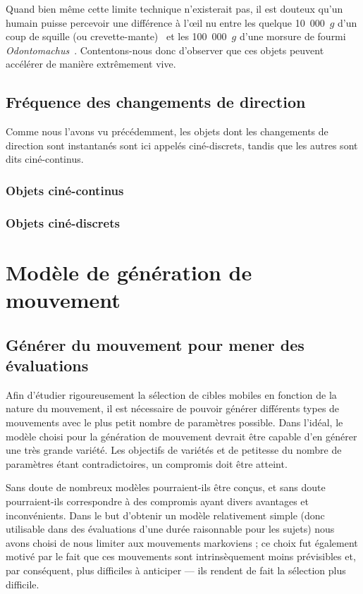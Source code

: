 	
	Quand bien même cette limite technique n'existerait pas, il est douteux qu'un humain puisse percevoir une différence à l'œil nu entre les quelque 10~000~$g$ d'un coup de squille (ou crevette-mante)~\cite{patek2004biomechanics} et les 100~000~$g$ d'une morsure de fourmi \emph{Odontomachus}~\cite{patek2006multifunctionality}. Contentons-nous donc d'observer que ces objets peuvent accélérer de manière extrêmement vive.
	
	\subsection{Fréquence des changements de direction}
	Comme nous l'avons vu précédemment, les objets dont les changements de direction sont instantanés sont ici appelés ciné-discrets, tandis que les autres sont dits ciné-continus.
	
	\subsubsection{Objets ciné-continus}
	
	\subsubsection{Objets ciné-discrets}

\section{Modèle de génération de mouvement}
    \subsection{Générer du mouvement pour mener des évaluations}
    Afin d'étudier rigoureusement la sélection de cibles mobiles en fonction de la nature du mouvement, il est nécessaire de pouvoir générer différents types de mouvements avec le plus petit nombre de paramètres possible. Dans l'idéal, le modèle choisi pour la génération de mouvement devrait être capable d'en générer une très grande variété. Les objectifs de variétés et de petitesse du nombre de paramètres étant contradictoires, un compromis doit être atteint.
    
    Sans doute de nombreux modèles pourraient-ils être conçus, et sans doute pourraient-ils correspondre à des compromis ayant divers avantages et inconvénients. Dans le but d'obtenir un modèle relativement simple (donc utilisable dans des évaluations d'une durée raisonnable pour les sujets) nous avons choisi de nous limiter aux mouvements markoviens ; ce choix fut également motivé par le fait que ces mouvements sont intrinsèquement moins prévisibles et, par conséquent, plus difficiles à anticiper --- ils rendent de fait la sélection plus difficile.
    

